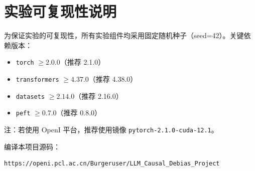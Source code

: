 \documentclass[12pt,a4paper,oneside]{ctexart}
\begin{document}
\section{实验可复现性说明}

为保证实验的可复现性，所有实验组件均采用固定随机种子（seed=42）。关键依赖版本：
\begin{itemize}
  \item \texttt{torch} $\geq 2.0.0$（推荐 2.1.0）
  \item \texttt{transformers} $\geq 4.37.0$（推荐 4.38.0）
  \item \texttt{datasets} $\geq 2.14.0$（推荐 2.16.0）
  \item \texttt{peft} $\geq 0.7.0$（推荐 0.8.0）
\end{itemize}

注：若使用 OpenI 平台，推荐使用镜像 \texttt{pytorch-2.1.0-cuda-12.1}。

编译本项目源码：
\begin{lstlisting}
https://openi.pcl.ac.cn/Burgeruser/LLM_Causal_Debias_Project
\end{lstlisting}
\end{document}
